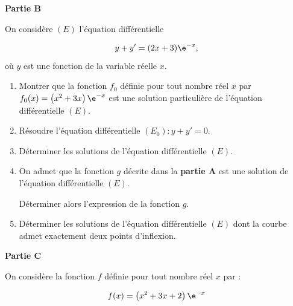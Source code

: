 \medskip

\textbf{Partie B}

\medskip

On considère $(E)$ l'équation différentielle 

\[y+y'=(2x + 3) \e^{-x},\]
où $y$ est une fonction de la variable réelle $x$.

\medskip

\begin{enumerate}
\item Montrer que la fonction $f_{0}$ définie pour tout nombre réel $x$ par $f_{0}(x)=\left(x^{2}+3 x\right) \e^{-x}$ est une solution particulière de l'équation différentielle $(E)$.
\item Résoudre l'équation différentielle $\left(E_{0}\right): y+ y'= 0$.
\item Déterminer les solutions de l'équation différentielle $(E)$.
\item On admet que la fonction $g$ décrite dans la \textbf{partie A} est une solution de l'équation différentielle $(E)$.

Déterminer alors l'expression de la fonction $g$.
\item Déterminer les solutions de l'équation différentielle $(E)$ dont la courbe admet exactement deux points d'inflexion.
\end{enumerate}

\medskip

\textbf{Partie C}

\medskip

On considère la fonction $f$ définie pour tout nombre réel $x$ par :

\[f(x)=\left(x^{2}+3 x+2\right) \e^{-x}\]

